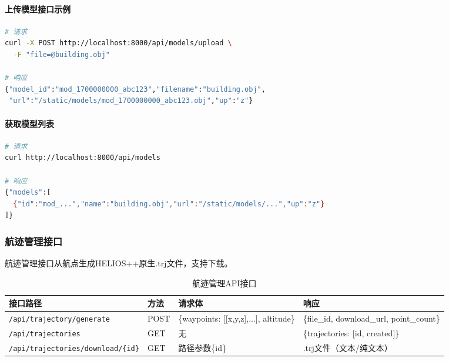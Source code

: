 \documentclass[a4paper,fleqn]{cas-sc}
\begin{document}
\paragraph{上传模型接口示例}
\begin{lstlisting}[language=bash,caption=上传3D模型]
# 请求
curl -X POST http://localhost:8000/api/models/upload \
  -F "file=@building.obj"

# 响应
{"model_id":"mod_1700000000_abc123","filename":"building.obj",
 "url":"/static/models/mod_1700000000_abc123.obj","up":"z"}
\end{lstlisting}

\paragraph{获取模型列表}
\begin{lstlisting}[language=bash,caption=获取模型列表]
# 请求
curl http://localhost:8000/api/models

# 响应
{"models":[
  {"id":"mod_...","name":"building.obj","url":"/static/models/...","up":"z"}
]}
\end{lstlisting}

\subsubsection{航迹管理接口}
航迹管理接口从航点生成HELIOS++原生.trj文件，支持下载。

\begin{table}[pos=!htbp]
    \centering
    \caption{航迹管理API接口}
    \label{tab:api-trajectory}
    \begin{tabular}{@{} llll @{}}
        \toprule
        \textbf{接口路径}                              & \textbf{方法} & \textbf{请求体}                           & \textbf{响应}                               \\
        \midrule
        \texttt{/api/trajectory/generate}          & POST        & \{waypoints: [[x,y,z],...], altitude\} & \{file\_id, download\_url, point\_count\} \\
        \texttt{/api/trajectories}                 & GET         & 无                                      & \{trajectories: [{id, created}]\}         \\
        \texttt{/api/trajectories/download/\{id\}} & GET         & 路径参数\{id\}                             & .trj文件（文本/纯文本）                            \\
        \bottomrule
    \end{tabular}
\end{table}
\end{document}
